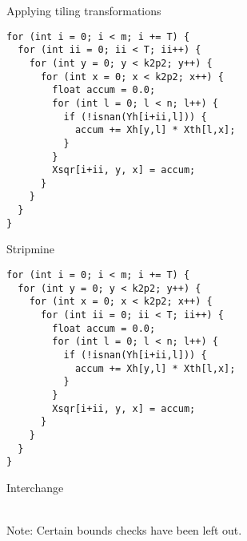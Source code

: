 \begin{frame}[fragile]{Applying tiling transformations}

\begin{minipage}{.55\textwidth}
\begin{verbatim}
for (int i = 0; i < m; i += T) {
  for (int ii = 0; ii < T; ii++) {
    for (int y = 0; y < k2p2; y++) {
      for (int x = 0; x < k2p2; x++) {
        float accum = 0.0;
        for (int l = 0; l < n; l++) {
          if (!isnan(Yh[i+ii,l])) {
            accum += Xh[y,l] * Xth[l,x];
          }
        }
        Xsqr[i+ii, y, x] = accum;
      }
    }
  }
}
\end{verbatim}
\begin{center}
  Stripmine
\end{center}
\end{minipage}%
\begin{minipage}{.5\textwidth}
  \centering
  \begin{verbatim}
for (int i = 0; i < m; i += T) {
  for (int y = 0; y < k2p2; y++) {
    for (int x = 0; x < k2p2; x++) {
      for (int ii = 0; ii < T; ii++) {
        float accum = 0.0;
        for (int l = 0; l < n; l++) {
          if (!isnan(Yh[i+ii,l])) {
            accum += Xh[y,l] * Xth[l,x];
          }
        }
        Xsqr[i+ii, y, x] = accum;
      }
    }
  }
}
\end{verbatim}
\begin{center}
  Interchange
\end{center}
\end{minipage}
\hfill\\
Note: Certain bounds checks have been left out.
\end{frame}

